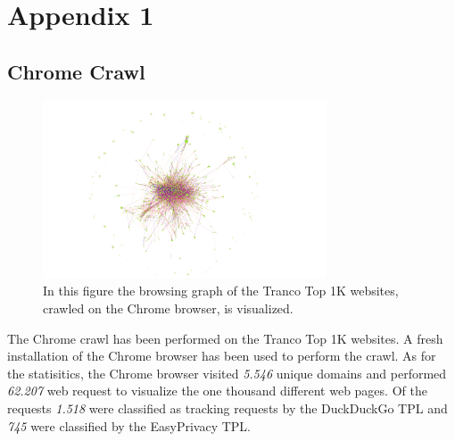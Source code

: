 \chapter{Appendix 1}
\section{Chrome Crawl}
\begin{figure}[ht!]
\begin{center}
\includegraphics[width=0.75\textwidth]{images/chrome.png}
\end{center}
\caption{In this figure the browsing graph of the Tranco Top 1K websites, crawled on the Chrome browser, is visualized. }
\end{figure}
The Chrome crawl has been performed on the Tranco Top 1K websites. A fresh installation of the Chrome browser has been used to perform
the crawl. As for the statisitics, the Chrome browser visited \emph{5.546} unique domains and performed \emph{62.207} web request to 
visualize the one thousand different web pages. Of the requests \emph{1.518} were classified as tracking requests by the DuckDuckGo 
TPL and \emph{745} were classified by the EasyPrivacy TPL.
